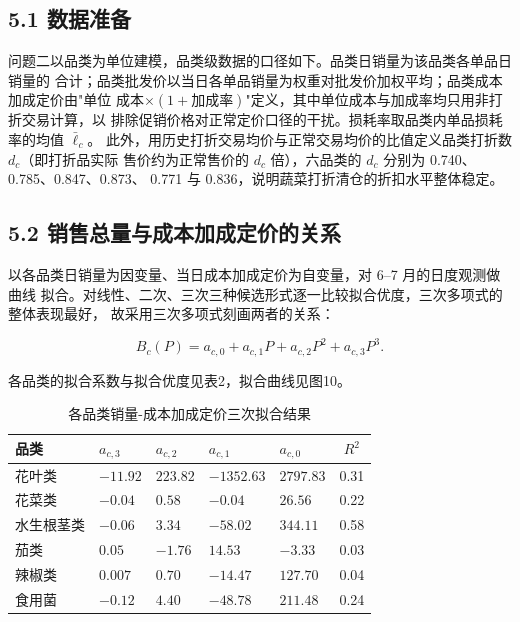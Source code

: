 
\subsection{5.1 数据准备}

问题二以品类为单位建模，品类级数据的口径如下。品类日销量为该品类各单品日销量的
合计；品类批发价以当日各单品销量为权重对批发价加权平均；品类成本加成定价由"单位
成本$\times(1+\text{加成率})$"定义，其中单位成本与加成率均只用非打折交易计算，以
排除促销价格对正常定价口径的干扰。损耗率取品类内单品损耗率的均值 $\bar\ell_c$。
此外，用历史打折交易均价与正常交易均价的比值定义品类打折数 $d_c$（即打折品实际
售价约为正常售价的 $d_c$ 倍），六品类的 $d_c$ 分别为 0.740、0.785、0.847、0.873、
0.771 与 0.836，说明蔬菜打折清仓的折扣水平整体稳定。

\subsection{5.2 销售总量与成本加成定价的关系}

以各品类日销量为因变量、当日成本加成定价为自变量，对 6--7 月的日度观测做曲线
拟合。对线性、二次、三次三种候选形式逐一比较拟合优度，三次多项式的整体表现最好，
故采用三次多项式刻画两者的关系：

\begin{equation}
B_c(P)=a_{c,0}+a_{c,1}P+a_{c,2}P^2+a_{c,3}P^3.
\label{eq:cubic}
\end{equation}

各品类的拟合系数与拟合优度见表2，拟合曲线见图10。

\begin{table}[H]
\centering
\caption{各品类销量-成本加成定价三次拟合结果}
\label{tab:cubic}
\small
\begin{tabular}{lllllc}
\toprule
品类 & $a_{c,3}$ & $a_{c,2}$ & $a_{c,1}$ & $a_{c,0}$ & $R^2$ \\
\midrule
花叶类 & $-11.92$ & $223.82$ & $-1352.63$ & $2797.83$ & 0.31 \\
花菜类 & $-0.04$ & $0.58$ & $-0.04$ & $26.56$ & 0.22 \\
水生根茎类 & $-0.06$ & $3.34$ & $-58.02$ & $344.11$ & 0.58 \\
茄类 & $0.05$ & $-1.76$ & $14.53$ & $-3.33$ & 0.03 \\
辣椒类 & $0.007$ & $0.70$ & $-14.47$ & $127.70$ & 0.04 \\
食用菌 & $-0.12$ & $4.40$ & $-48.78$ & $211.48$ & 0.24 \\
\bottomrule
\end{tabular}
\end{table}

